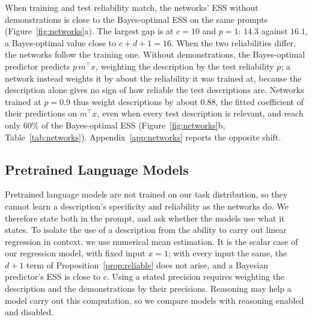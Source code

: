 \documentclass{article}
\theoremstyle{definition}
\begin{document}
When training and test reliability match, the networks' ESS without demonstrations is close to the Bayes-optimal ESS on the same prompts (Figure~\ref{fig:networks}a). The largest gap is at $c=10$ and $p=1$: $14.3$ against $16.1$, a Bayes-optimal value close to $c+d+1=16$. When the two reliabilities differ, the networks follow the training one. Without demonstrations, the Bayes-optimal predictor predicts $p\,m^\top x$, weighting the description by the test reliability $p$; a network instead weights it by about the reliability it was trained at, because the description alone gives no sign of how reliable the test descriptions are. Networks trained at $p=0.9$ thus weight descriptions by about $0.88$, the fitted coefficient of their predictions on $m^\top x$, even when every test description is relevant, and reach only $60\%$ of the Bayes-optimal ESS (Figure~\ref{fig:networks}b, Table~\ref{tab:networks}). Appendix~\ref{app:networks} reports the opposite shift.

\subsection{Pretrained Language Models}\label{sec:llm}

Pretrained language models are not trained on our task distribution, so they cannot learn a description's specificity and reliability as the networks do. We therefore state both in the prompt, and ask whether the models use what it states. To isolate the use of a description from the ability to carry out linear regression in context, we use numerical mean estimation. It is the scalar case of our regression model, with fixed input $x=1$; with every input the same, the $d+1$ term of Proposition~\ref{prop:reliable} does not arise, and a Bayesian predictor's ESS is close to $c$. Using a stated precision requires weighting the description and the demonstrations by their precisions. Reasoning may help a model carry out this computation, so we compare models with reasoning enabled and disabled.
\end{document}
